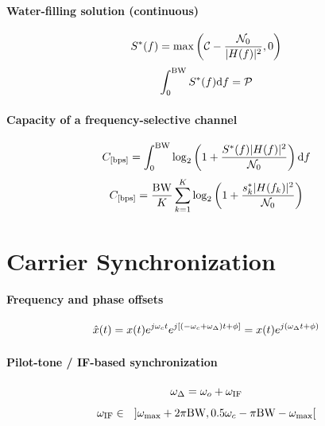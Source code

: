 \paragraph{Water-filling solution (continuous)}
\begin{equation}
S^*(f) = \max \left({\cal C} - \frac{{\cal N}_0}{|H(f)|^2}, 0 \right)
\label{eq:waterfillingContinuosSolution}
\end{equation}
\begin{equation}
\int_{0}^{{\textrm{BW}}} S^*(f) \textrm{d}f = {\cal P}
\label{eq:waterfillingContinuosSolutionConstrain}
\end{equation}

\paragraph{Capacity of a frequency-selective channel}
\begin{equation}
C_{[\textrm{bps}]} = \int_{0}^{{\textrm{BW}}} \log_2 \left( 1 + \frac{S^*(f) |H(f)|^2}{{\cal N}_0} \right) \textrm{d}f
\label{eq:frequencySelectiveCapacity}
\end{equation}
\begin{equation}
C_{[\textrm{bps}]} = \frac{{\textrm{BW}}}{K} \sum_{k=1}^K \log_2 \left( 1 + \frac{s_k^* |H(f_k)|^2}{{\cal N}_0} \right)
\end{equation}

\section*{Carrier Synchronization}

\paragraph{Frequency and phase offsets}
\begin{equation}
\hat x(t) = x(t) e^{j {\omega}_c t} e^{j[(- {\omega}_c + {\omega}_{\Delta}) t + \phi]} = x(t) e^{j({\omega}_{\Delta} t + \phi)}
\label{eq:offsets_freq_phase}
\end{equation}

\paragraph{Pilot-tone / IF-based synchronization}
\begin{equation}
{\omega}_{\Delta} = {\omega}_o + {\omega}_{\textrm{IF}}
\label{eq:syncViaIF}
\end{equation}
\begin{equation}
{\omega}_{\textrm{IF}} \in \textrm{~~} ]{\omega}_{\textrm{max}} + 2 \pi {\textrm{BW}}, 0.5{\omega}_c - \pi {\textrm{BW}} - {\omega}_{\textrm{max}}[
\label{eq:ifRange}
\end{equation}


